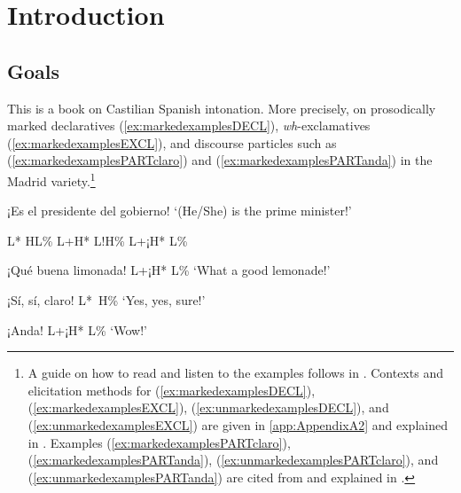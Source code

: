 
\chapter{Introduction} %

\label{ch:1} %


\section{Goals}
\label{sec:1.1}

This is a book on Castilian Spanish intonation. More precisely, on prosodically marked declaratives (\ref{ex:markedexamplesDECL}), \textit{wh}-exclamatives (\ref{ex:markedexamplesEXCL}), and discourse particles such as (\ref{ex:markedexamplesPARTclaro}) and (\ref{ex:markedexamplesPARTanda}) in the Madrid variety.\footnote{A guide on how to read and listen to the examples follows in . Contexts and elicitation methods for (\ref{ex:markedexamplesDECL}), (\ref{ex:markedexamplesEXCL}), (\ref{ex:unmarkedexamplesDECL}), and (\ref{ex:unmarkedexamplesEXCL}) are given in \autoref{app:AppendixA2} and explained in . Examples (\ref{ex:markedexamplesPARTclaro}), (\ref{ex:markedexamplesPARTanda}), (\ref{ex:unmarkedexamplesPARTclaro}), and (\ref{ex:unmarkedexamplesPARTanda}) are cited from \citet{PRESEEA.20142020} and explained in .}

\begin{exe}
\ex \label{ex:markedexamplesDECL} ¡Es el presidente del gobierno! 
\glt `(He/She) is the prime minister!'
	\begin{xlist}
	\ex L* HL\% \href{https://osf.io/9wfsq/}{\faVolumeUp}
	\ex L+H* L!H\% \href{https://osf.io/wk46m/}{\faVolumeUp} 
	\ex L+¡H* L\% \href{https://osf.io/ghcbu/}{\faVolumeUp} 
	\end{xlist}

\ex \label{ex:markedexamplesEXCL} ¡Qué buena limonada! L+¡H* L\% \href{https://osf.io/xcvfh/}{\faVolumeUp}
\glt `What a good lemonade!' 

\ex \label{ex:markedexamplesPARTclaro} ¡Sí, sí, claro! L*~H\% \href{https://osf.io/5z7f4/}{\faVolumeUp}
\glt `Yes, yes, sure!' 

\ex \label{ex:markedexamplesPARTanda} ¡Anda! L+¡H* L\%  \href{https://osf.io/kqvn2/}{\faVolumeUp}
\glt `Wow!'
\end{exe}

